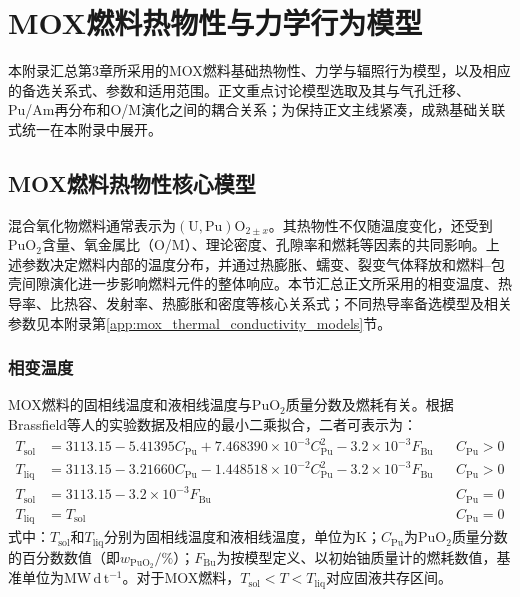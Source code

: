 \chapter{MOX燃料热物性与力学行为模型}
\label{app:mox_supplementary_models}

本附录汇总第3章所采用的MOX燃料基础热物性、力学与辐照行为模型，以及相应的备选关系式、参数和适用范围。正文重点讨论模型选取及其与气孔迁移、Pu/Am再分布和O/M演化之间的耦合关系；为保持正文主线紧凑，成熟基础关联式统一在本附录中展开。

\section{MOX燃料热物性核心模型}
\label{app:mox_core_thermophysical_models}

混合氧化物燃料通常表示为$(\mathrm{U},\mathrm{Pu})\mathrm{O}_{2\pm x}$。其热物性不仅随温度变化，还受到$\mathrm{PuO}_2$含量、氧金属比（O/M）、理论密度、孔隙率和燃耗等因素的共同影响。上述参数决定燃料内部的温度分布，并通过热膨胀、蠕变、裂变气体释放和燃料--包壳间隙演化进一步影响燃料元件的整体响应。本节汇总正文所采用的相变温度、热导率、比热容、发射率、热膨胀和密度等核心关系式；不同热导率备选模型及相关参数见本附录第\ref{app:mox_thermal_conductivity_models}节。

\subsection{相变温度}

MOX燃料的固相线温度和液相线温度与$\mathrm{PuO}_2$质量分数及燃耗有关。根据Brassfield等人的实验数据及相应的最小二乘拟合，二者可表示为：
\begin{subequations}\label{eq:mox_phase_transition_temperature}
	\begin{align}
		T_{\mathrm{sol}}
		&=3113.15-5.41395C_{\mathrm{Pu}}
		+7.468390\times10^{-3}C_{\mathrm{Pu}}^{2}
		-3.2\times10^{-3}F_{\mathrm{Bu}}
		&& C_{\mathrm{Pu}}>0\label{eq:mox_solidus_with_pu}\\
		T_{\mathrm{liq}}
		&=3113.15-3.21660C_{\mathrm{Pu}}
		-1.448518\times10^{-2}C_{\mathrm{Pu}}^{2}
		-3.2\times10^{-3}F_{\mathrm{Bu}}
		&& C_{\mathrm{Pu}}>0\label{eq:mox_liquidus_with_pu}\\
		T_{\mathrm{sol}}
		&=3113.15-3.2\times10^{-3}F_{\mathrm{Bu}}
		&& C_{\mathrm{Pu}}=0\label{eq:uo2_solidus}\\
		T_{\mathrm{liq}}&=T_{\mathrm{sol}}
		&& C_{\mathrm{Pu}}=0\label{eq:uo2_liquidus}
	\end{align}
\end{subequations}
\noindent 式中：$T_{\mathrm{sol}}$和$T_{\mathrm{liq}}$分别为固相线温度和液相线温度，单位为$\mathrm{K}$；$C_{\mathrm{Pu}}$为$\mathrm{PuO}_2$质量分数的百分数数值（即$w_{\mathrm{PuO}_2}/\%$）；$F_{\mathrm{Bu}}$为按模型定义、以初始铀质量计的燃耗数值，基准单位为$\mathrm{MW\,d\,t^{-1}}$。对于MOX燃料，$T_{\mathrm{sol}}<T<T_{\mathrm{liq}}$对应固液共存区间。

